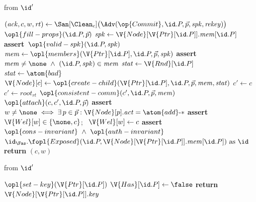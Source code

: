 \begin{interface}
{ \quad from $\id'$
\begin{algorithmic}[1]
\algcont
{}
\State $(\mathit{ack}, c, w, \mathit{rt}) \gets \San[\Clean_{c}]\bigl(\Adv(\op{Commit}, \id.P, \vec{p}, \mathit{spk}, \mathit{rekey})\bigr)$
\EndIf
\State $\opl{fill-props}(\id.P, \vec{p})$
  \State $\mathit{spk} \gets \V{Node}[\V{Ptr}[\id.P]].\mathit{mem}[\id.P]$ \label{ln:cgkanorekey}
\EndIf
\State \textbf{assert}\ $\opl{valid-spk}(\id.P, \mathit{spk})$
\State $\mathit{mem} \gets \opl{members}(\V{Ptr}[\id.P], \id.P, \vec{p}, \mathit{spk})$
\State \textbf{assert}\ $\mathit{mem} \neq \none \ \wedge\ (\id.P, \mathit{spk}) \in \mathit{mem}$
 \label{ln:cgkafreshnode}
  \State $\mathit{stat} \gets \V{Rnd}[\id.P]$
    \State $\mathit{stat} \gets \atom{bad}$ \label{ln:cgkaaddonlybad}
  \EndIf
  \State $\V{Node}[c] \gets \opl{create-child}(\V{Ptr}[\id.P], \id.P, \vec{p}, \mathit{mem}, \mathit{stat})$
\EndIf
{} \label{ln:cgkainjected}
  \State $c' \gets c$
    \State $c' \gets \mathit{root}_{\mathit{rt}}$
  \EndIf
  \State $\opl{consistent-comm}(c', \id.P, \vec{p}, \mathit{mem})$
    \State $\opl{attach}(c, c', \id.P, \vec{p})$ \label{ln:cgkaattach}
  \EndIf
\EndIf
\State \textbf{assert}\ $w \neq \none \iff \exists\, p \in \vec{p} : \V{Node}[p].\mathit{act} = \atom{add}\text{-}*$
  \State \textbf{assert}\ $\V{Wel}[w] \in \{\none, c\}$; \ $\V{Wel}[w] \gets c$
\EndIf
\State \textbf{assert}\ $\opl{cons-invariant} \ \wedge\ \opl{auth-invariant}$ \label{ln:cgkacommitinv}
  \State $\id_{\Fas}.\fopl{Exposed}(\id.P, \V{Node}[\V{Ptr}[\id.P]].\mathit{mem}[\id.P]) \text{ as } \id$
\EndIf
\State \textbf{return} $(c, w)$
\algsave
\end{algorithmic}
\vspace{1.4ex}

 \quad from $\id'$
\begin{algorithmic}[1]
\algcont
{} \label{ln:cgkakeyonce}
  \State $\opl{set-key}(\V{Ptr}[\id.P])$ \label{ln:cgkasetkey}
\EndIf
\State $\V{Has}[\id.P] \gets \false$ \label{ln:cgkaconsume}
\State \textbf{return} $\V{Node}[\V{Ptr}[\id.P]].\mathit{key}$
\algsave
\end{algorithmic}
\vspace{1.4ex}

}
\end{interface}
